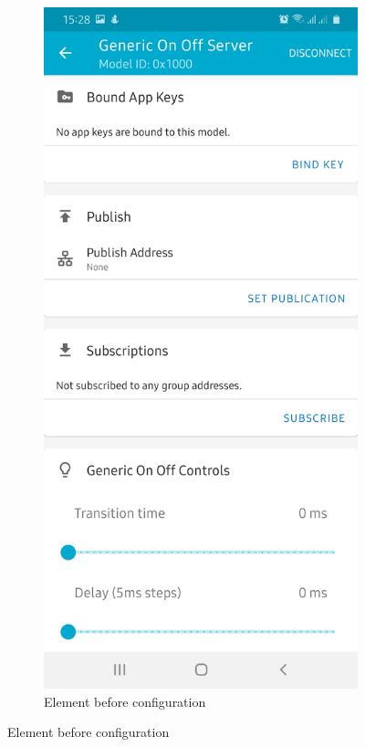\documentclass[\main/main.tex]{subfiles}
\begin{document}
\begin{figure}[H]
    \centering
    \begin{subfigure}[b]{0.4\linewidth}
        \centering
        \includegraphics[width=0.9\linewidth]{nRF_Mesh_06.jpg}
        \caption{Element before configuration}
    \end{subfigure}

\end{figure}
\end{document}
